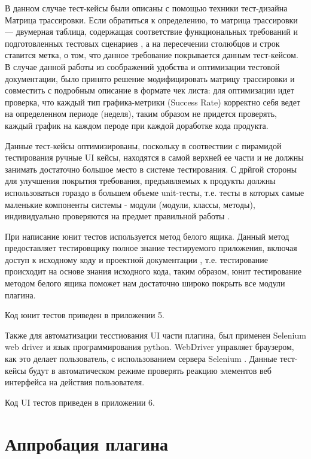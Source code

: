 В данном случае тест-кейсы были описаны с помощью техники тест-дизайна Матрица трассировки. Если обратиться к определению, то матрица трассировки — двумерная таблица, содержащая соответствие функциональных требований и подготовленных тестовых сценариев \cite{matrixtest}, а на пересечении столюбцов и строк ставится метка, о том, что данное требование покрывается данным тест-кейсом. В случае данной работы из соображений удобства и оптимизации тестовой документации, было принято решение модифицировать матрицу трассировки и совместить с подробным описание в формате чек листа: для оптимизации идет проверка, что каждый тип графика-метрики (Success Rate) корректно себя ведет на определенном периоде (неделя), таким образом не придется проверять, каждый график на каждом пероде при каждой доработке кода продукта.

Данные тест-кейсы оптимизированы, поскольку в соотвествии с пирамидой тестирования \cite{TestPyramid} ручные UI кейсы, находятся в самой верхней ее части и не должны занимать достаточно большое место в системе тестирования. С дрйгой стороны для улучшения покрытия требования, предъявляемых к продукты должны использоваться гораздо в большем объеме unit-тесты, т.е. тесты в которых самые маленькие компоненты системы - модули (модули, классы, методы), индивидуально проверяются на предмет правильной работы \cite{unittest}.

При написание юнит тестов используется метод белого ящика. Данный метод предоставляет тестировщику полное знание тестируемого приложения, включая доступ к исходному коду и проектной документации \cite {whitebox}, т.е. тестирование происходит на основе знания исходного кода, таким образом, юнит тестирование методом белого ящика поможет нам достаточно широко покрыть все модули плагина.

Код юнит тестов приведен в приложении 5.

Также для автоматизации тесстиования UI части плагина, был применен Selenium web driver и язык программирования python. WebDriver управляет браузером, как это делает пользователь, с использованием сервера Selenium \cite{webdriver}. Данные тест-кейсы будут в автоматическом режиме проверять реакцию элементов веб интерфейса на действия пользователя.

Код UI тестов приведен в приложении 6.



 \section{Аппробация плагина} \label{ch4:sec2}
 

